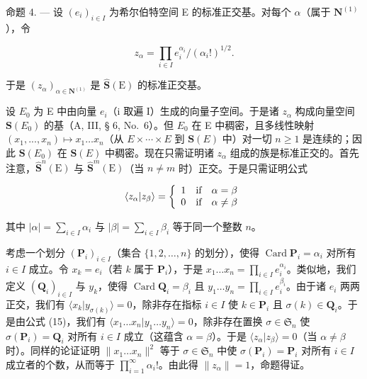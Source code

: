 命题 4. --- 设 \((e_{i})_{i\in I}\) 为希尔伯特空间 E 的标准正交基。对每个 \(\alpha\)（属于 \(\mathbf{N}^{(1)}\)），令

\[
z _ {\alpha} = \prod_ {i \in I} e _ {i} ^ {\alpha_ {i}} / (\alpha_ {i}!) ^ {1 / 2}.\tag{17}
\]

于是 \((z_{\alpha})_{\alpha \in \mathbf{N}^{(1)}}\) 是 \(\hat{\mathbf{S}} (\mathrm{E})\) 的标准正交基。

设 \(E_{0}\) 为 E 中由向量 \(e_{i}\)（i 取遍 I）生成的向量子空间。于是诸 \(z_{\alpha}\) 构成向量空间 \(\mathbf{S}(E_{0})\) 的基（A, III, § 6, No.~6）。但 \(E_{0}\) 在 E 中稠密，且多线性映射 \((x_{1},...,x_{n})\mapsto x_{1}\ldots x_{n}\)（从 \(E\times\cdots\times E\) 到 \(\mathbf{S}(E)\) 中）对一切 \(n\geqslant1\) 是连续的；因此 \(\mathbf{S}(E_{0})\) 在 \(\mathbf{S}(E)\) 中稠密。现在只需证明诸 \(z_{\alpha}\) 组成的族是标准正交的。首先注意，\(\hat{\mathbf{S}}^{n}(\mathrm{E})\) 与 \(\hat{\mathbf{S}}^{m}(\mathrm{E})\)（当 \(n \neq m\) 时）正交。于是只需证明公式

\[
\langle z _ {\alpha} | z _ {\beta} \rangle = \left\{ \begin{array}{l l} 1 & \text {if} \quad \alpha = \beta \\ 0 & \text {if} \quad \alpha \neq \beta \end{array} \right.
\]

其中 \(|\alpha| = \sum_{i \in I} \alpha_i\) 与 \(|\beta| = \sum_{i \in I} \beta_i\) 等于同一个整数 \(n\)。

考虑一个划分 \((\mathbf{P}_i)_{i\in I}\)（集合 \(\{1,2,\dots,n\}\) 的划分），使得 \(\operatorname{Card} \mathbf{P}_i = \alpha_i\) 对所有 \(i\in I\) 成立。令 \(x_k = e_i\)（若 \(k\) 属于 \(\mathbf{P}_i\)），于是 \(x_1\ldots x_n = \prod_{i\in I}e_i^{\alpha_i}\)。类似地，我们定义 \((\mathbf{Q}_i)_{i\in I}\) 与 \(y_k\)，使得 \(\operatorname{Card} \mathbf{Q}_i = \beta_i\) 且 \(y_1\ldots y_n = \prod_{i\in I}e_i^{\beta_i}\)。由于诸 \(e_i\) 两两正交，我们有 \(\langle x_k|y_{\sigma(k)}\rangle = 0\)，除非存在指标 \(i\in I\) 使 \(k\in \mathbf{P}_i\) 且 \(\sigma (k)\in \mathbf{Q}_i\)。于是由公式 (15)，我们有 \(\langle x_1\ldots x_n|y_1\ldots y_n\rangle = 0\)，除非存在置换 \(\sigma \in \mathfrak{S}_n\) 使 \(\sigma (\mathbf{P}_i) = \mathbf{Q}_i\) 对所有 \(i\in I\) 成立（这蕴含 \(\alpha = \beta\)）。于是 \(\langle z_{\alpha}|z_{\beta}\rangle = 0\)（当 \(\alpha \neq \beta\) 时）。同样的论证证明 \(\| x_1\ldots x_n\|^2\) 等于 \(\sigma \in \mathfrak{S}_n\) 中使 \(\sigma (\mathbf{P}_i) = \mathbf{P}_i\) 对所有 \(i\in I\) 成立者的个数，从而等于 \(\prod_{i=1}^{\infty}\alpha_i!\)。由此得 \(\| z_\alpha \| = 1\)，命题得证。

